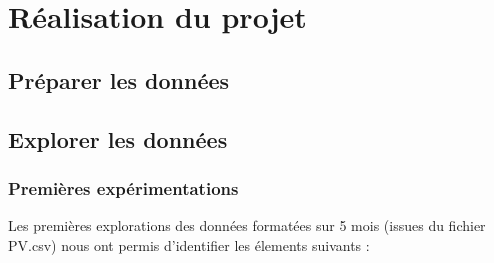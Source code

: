 \chapter{Réalisation du projet}

\section{Préparer les données}
\section{Explorer les données}
\subsection{Premières expérimentations}
Les premières explorations des données formatées sur 5 mois (issues du fichier PV.csv) nous ont permis d'identifier les élements suivants :

